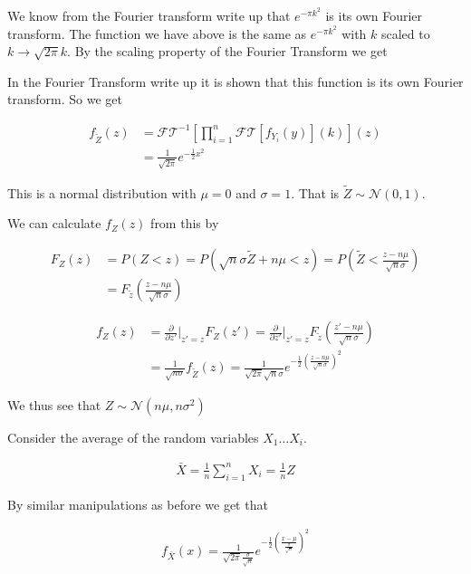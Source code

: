 \documentclass[12pt]{article}
\begin{document}
We know from the Fourier transform write up that $e^{-\pi k^2}$ is its own Fourier transform. The function we have above is the same as $e^{-\pi k^2}$ with $k$ scaled to $k \rightarrow \sqrt{2\pi} k$. By the scaling property of the Fourier Transform we get

In the Fourier Transform write up it is shown that this function is its own Fourier transform. So we get

\begin{align}
f_{\tilde{Z}}(z) &= \mathcal{FT}^{-1}\left[\prod_{i=1}^n \mathcal{FT}[f_{Y_i}(y)](k) \right](z)\\
&= \frac{1}{\sqrt{2\pi}}e^{-\frac{1}{2} x^2}
\end{align}

This is a normal distribution with $\mu = 0$ and $\sigma = 1$. That is $\tilde{Z} \sim \mathcal{N}(0,1)$.

We can calculate $f_{Z}(z)$ from this by

\begin{align}
F_Z(z) &= P(Z<z) = P(\sqrt{n} \sigma \tilde{Z} + n \mu < z) = P\left( \tilde{Z} < \frac{z-n\mu}{\sqrt{n} \sigma} \right)\\
&= F_{\tilde{z}}\left(\frac{z-n\mu}{\sqrt{n}\sigma} \right)
\end{align}

\begin{align}
f_{Z}(z) &= \frac{\partial}{\partial z'}\Bigg \vert_{z'=z} F_{Z}(z') =  \frac{\partial}{\partial z'}\Bigg \vert_{z'=z}F_{\tilde{z}}\left(\frac{z'-n\mu}{\sqrt{n}\sigma} \right)\\
&= \frac{1}{\sqrt{n \sigma}} f_{\tilde{Z}}(z) = \frac{1}{\sqrt{2\pi} \sqrt{n} \sigma} e^{-\frac{1}{2}\left(\frac{z-n\mu}{\sqrt{n}\sigma} \right)^2}
\end{align}

We thus see that $Z \sim \mathcal{N}(n\mu, n\sigma^2)$

Consider the average of the random variables $X_1 \ldots X_i$.

\begin{align}
\bar{X} = \frac{1}{n} \sum_{i=1}^{n} X_i = \frac{1}{n} Z
\end{align}

By similar manipulations as before we get that

\begin{align}
f_{\bar{X}}(x) = \frac{1}{\sqrt{2\pi}\frac{\sigma}{\sqrt{n}}} e^{-\frac{1}{2}\left(\frac{x-\mu}{\frac{\sigma}{\sqrt{n}}} \right)^2}
\end{align}
\end{document}
